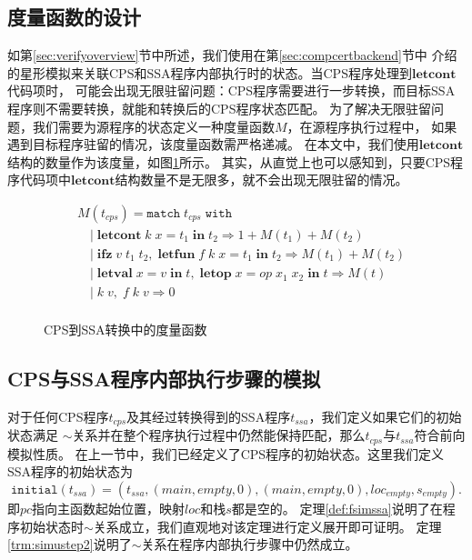 \subsection{度量函数的设计}

如第\ref{sec:verifyoverview}节中所述，我们使用在第\ref{sec:compcertbackend}节中
介绍的星形模拟来关联CPS和SSA程序内部执行时的状态。当CPS程序处理到$\mathbf{letcont}$代码项时，
可能会出现无限驻留问题：CPS程序需要进行一步转换，而目标SSA程序则不需要转换，就能和转换后的CPS程序状态匹配。
为了解决无限驻留问题，我们需要为源程序的状态定义一种度量函数$M$，在源程序执行过程中，
如果遇到目标程序驻留的情况，该度量函数需严格递减。
在本文中，我们使用$\mathbf{letcont}$结构的数量作为该度量，如图\ref{fig:measure}所示。
其实，从直觉上也可以感知到，只要CPS程序代码项中$\mathbf{letcont}$结构数量不是无限多，就不会出现无限驻留的情况。

\begin{figure}[htbp]
    \centering
    \begin{equation}
    \nonumber
        \begin{aligned}
            & M(t_{cps}) = \mathtt{match}\; t_{cps}\; \mathtt{with} \\
            & \quad |\; \mathbf{letcont}\; k\; x=t_1\; \mathbf{in}\; t_2 \Rightarrow 1 + M(t_1) + M(t_2) \\
            & \quad |\; \mathbf{ifz}\; v\; t_1\; t_2,\; \mathbf{letfun}\; f\; k\; x=t_1\; \mathbf{in}\; t_2 \Rightarrow M(t_1) + M(t_2) \\
            & \quad |\; \mathbf{letval}\; x=v\; \mathbf{in}\; t,\; \mathbf{letop}\; x=op\; x_1\; x_2\; \mathbf{in}\; t \Rightarrow M(t)\\
            & \quad |\; k\; v,\; f\; k\; v \Rightarrow 0 \\
        \end{aligned}
    \end{equation}
    \caption{CPS到SSA转换中的度量函数}\label{fig:measure}
\end{figure}


\subsection{CPS与SSA程序内部执行步骤的模拟}

对于任何CPS程序$t_{cps}$及其经过转换得到的SSA程序$t_{ssa}$，我们定义如果它们的初始状态满足
$\sim$关系并在整个程序执行过程中仍然能保持匹配，那么$t_{cps}$与$t_{ssa}$符合前向模拟性质。
在上一节中，我们已经定义了CPS程序的初始状态。这里我们定义SSA程序的初始状态为
\begin{equation}
\mathtt{initial}(t_{ssa}) = (t_{ssa}, (main, empty, 0), (main, empty, 0),loc_{empty}, s_{empty}).
\end{equation}
即$pc$指向主函数起始位置，映射$loc$和栈$s$都是空的。
定理\ref{def:fsimssa}说明了在程序初始状态时$\sim$关系成立，我们直观地对该定理进行定义展开即可证明。
定理\ref{trm:simustep2}说明了$\sim$关系在程序内部执行步骤中仍然成立。

